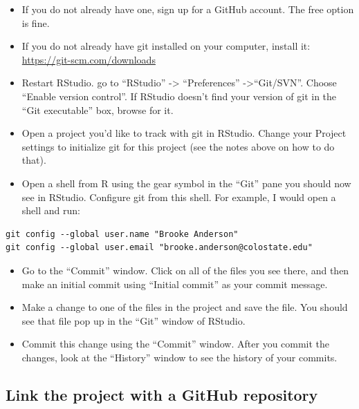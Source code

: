 \documentclass[]{tufte-book}
\providecommand{\tightlist}{%
  \setlength{\itemsep}{0pt}\setlength{\parskip}{0pt}}
\begin{document}
\begin{itemize}
\tightlist
\item
  If you do not already have one, sign up for a GitHub account. The free option
  is fine.
\item
  If you do not already have git installed on your computer, install it:
  \url{https://git-scm.com/downloads}
\item
  Restart RStudio. go to ``RStudio'' -\textgreater{} ``Preferences'' -\textgreater{}``Git/SVN''. Choose ``Enable
  version control''. If RStudio doesn't find your version of git in the ``Git
  executable'' box, browse for it.
\item
  Open a project you'd like to track with git in RStudio. Change your Project
  settings to initialize git for this project (see the notes above on how to do
  that).
\item
  Open a shell from R using the gear symbol in the ``Git'' pane you should now see
  in RStudio. Configure git from this shell. For example, I would open a shell and run:
\end{itemize}

\begin{verbatim}
git config --global user.name "Brooke Anderson"
git config --global user.email "brooke.anderson@colostate.edu"
\end{verbatim}

\begin{itemize}
\tightlist
\item
  Go to the ``Commit'' window. Click on all of the files you see there, and then
  make an initial commit using ``Initial commit'' as your commit message.
\item
  Make a change to one of the files in the project and save the file. You should
  see that file pop up in the ``Git'' window of RStudio.
\item
  Commit this change using the ``Commit'' window. After you commit the changes,
  look at the ``History'' window to see the history of your commits.
\end{itemize}

\hypertarget{link-the-project-with-a-github-repository}{%
\subsection{Link the project with a GitHub repository}\label{link-the-project-with-a-github-repository}}
\end{document}
